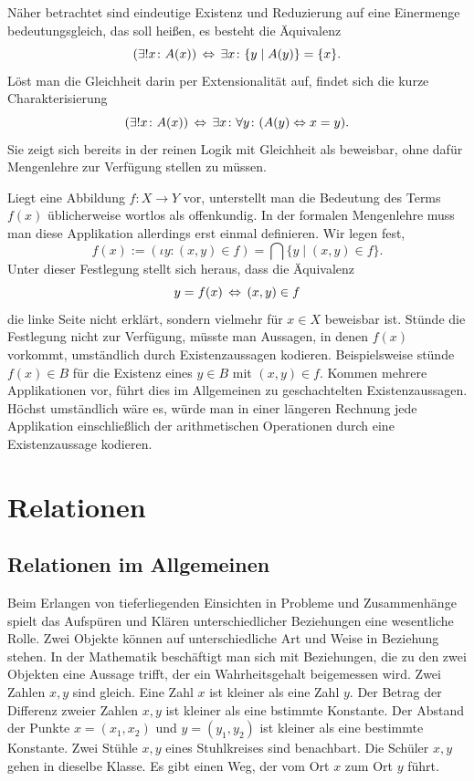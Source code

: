 Näher betrachtet sind eindeutige Existenz und Reduzierung auf eine
Einermenge bedeutungsgleich, das soll heißen, es besteht die Äquivalenz
\[(\exists! x\colon A(x))\,\Leftrightarrow\, \exists x\colon \{y\mid A(y)\} = \{x\}.\]
Löst man die Gleichheit darin per Extensionalität auf, findet sich die
kurze Charakterisierung
\[(\exists! x\colon A(x))\,\Leftrightarrow\, \exists x\colon\forall y\colon (A(y)\Leftrightarrow x=y).\]
Sie zeigt sich bereits in der reinen Logik mit Gleichheit als beweisbar,
ohne dafür Mengenlehre zur Verfügung stellen zu müssen.

Liegt eine Abbildung $f\colon X\to Y$ vor, unterstellt man die
Bedeutung des Terms $f(x)$ üblicherweise wortlos als offenkundig.
In der formalen Mengenlehre muss man diese Applikation allerdings erst
einmal definieren. Wir legen fest,
\[f(x) := (\iota y\colon (x,y)\in f)
= \textstyle{\bigcap}\{y\mid (x, y)\in f\}.\]
Unter dieser Festlegung stellt sich heraus, dass die Äquivalenz
\[y = f(x)\,\Leftrightarrow\, (x,y)\in f\]
die linke Seite nicht erklärt, sondern vielmehr für
$x\in X$ beweisbar ist. Stünde die Festlegung nicht zur Verfügung,
müsste man Aussagen, in denen $f(x)$ vorkommt, umständlich durch
Existenzaussagen kodieren. Beispielsweise stünde $f(x)\in B$ für die
Existenz eines $y\in B$ mit $(x,y)\in f$. Kommen mehrere Applikationen
vor, führt dies im Allgemeinen zu geschachtelten Existenzaussagen.
Höchst umständlich wäre es, würde man in einer längeren Rechnung jede
Applikation einschließlich der arithmetischen Operationen durch eine
Existenzaussage kodieren.

\section{Relationen}

\subsection{Relationen im Allgemeinen}

Beim Erlangen von tieferliegenden Einsichten in Probleme und
Zusammenhänge spielt das Aufspüren und Klären unterschiedlicher
Beziehungen eine wesentliche Rolle. Zwei Objekte können auf
unterschiedliche Art und Weise in Beziehung stehen. In der Mathematik
beschäftigt man sich mit Beziehungen, die zu den zwei Objekten eine
Aussage trifft, der ein Wahrheitsgehalt beigemessen wird. Zwei Zahlen
$x,y$ sind gleich. Eine Zahl $x$ ist kleiner als eine Zahl $y$. Der
Betrag der Differenz zweier Zahlen $x,y$ ist kleiner als eine bstimmte
Konstante. Der Abstand der Punkte $x=(x_1,x_2)$ und $y=(y_1,y_2)$ ist
kleiner als eine bestimmte Konstante. Zwei Stühle $x,y$ eines
Stuhlkreises sind benachbart. Die Schüler $x,y$ gehen in dieselbe
Klasse. Es gibt einen Weg, der vom Ort $x$ zum Ort $y$ führt.

